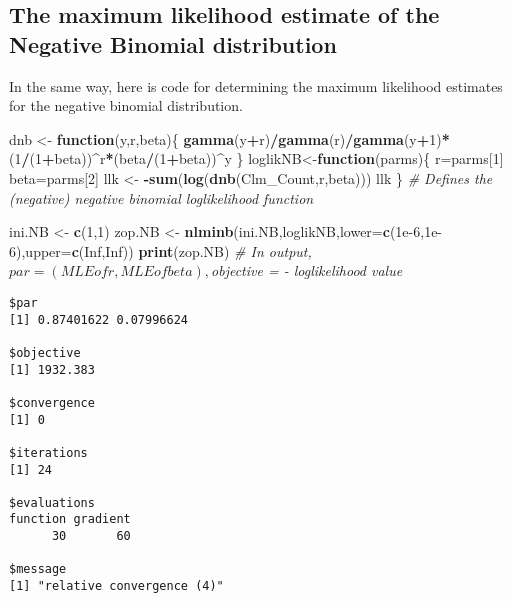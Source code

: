 \documentclass[]{book}
\newenvironment{Shaded}{\begin{snugshade}}{\end{snugshade}}
\newcommand{\KeywordTok}[1]{\textcolor[rgb]{0.13,0.29,0.53}{\textbf{#1}}}
\newcommand{\DataTypeTok}[1]{\textcolor[rgb]{0.13,0.29,0.53}{#1}}
\newcommand{\DecValTok}[1]{\textcolor[rgb]{0.00,0.00,0.81}{#1}}
\newcommand{\FloatTok}[1]{\textcolor[rgb]{0.00,0.00,0.81}{#1}}
\newcommand{\StringTok}[1]{\textcolor[rgb]{0.31,0.60,0.02}{#1}}
\newcommand{\CommentTok}[1]{\textcolor[rgb]{0.56,0.35,0.01}{\textit{#1}}}
\newcommand{\OtherTok}[1]{\textcolor[rgb]{0.56,0.35,0.01}{#1}}
\newcommand{\ControlFlowTok}[1]{\textcolor[rgb]{0.13,0.29,0.53}{\textbf{#1}}}
\newcommand{\OperatorTok}[1]{\textcolor[rgb]{0.81,0.36,0.00}{\textbf{#1}}}
\newcommand{\NormalTok}[1]{#1}
\theoremstyle{definition}
\theoremstyle{definition}
\theoremstyle{definition}
\theoremstyle{remark}
\begin{document}
\subsection{The maximum likelihood estimate of the Negative Binomial
distribution}\label{the-maximum-likelihood-estimate-of-the-negative-binomial-distribution}

In the same way, here is code for determining the maximum likelihood
estimates for the negative binomial distribution.

\begin{Shaded}
\begin{Highlighting}[]
\NormalTok{dnb <-}\StringTok{ }\ControlFlowTok{function}\NormalTok{(y,r,beta)\{}
  \KeywordTok{gamma}\NormalTok{(y}\OperatorTok{+}\NormalTok{r)}\OperatorTok{/}\KeywordTok{gamma}\NormalTok{(r)}\OperatorTok{/}\KeywordTok{gamma}\NormalTok{(y}\OperatorTok{+}\DecValTok{1}\NormalTok{)}\OperatorTok{*}\NormalTok{(}\DecValTok{1}\OperatorTok{/}\NormalTok{(}\DecValTok{1}\OperatorTok{+}\NormalTok{beta))}\OperatorTok{^}\NormalTok{r}\OperatorTok{*}\NormalTok{(beta}\OperatorTok{/}\NormalTok{(}\DecValTok{1}\OperatorTok{+}\NormalTok{beta))}\OperatorTok{^}\NormalTok{y}
\NormalTok{\}}
\NormalTok{loglikNB<-}\ControlFlowTok{function}\NormalTok{(parms)\{ }
\NormalTok{  r=parms[}\DecValTok{1}\NormalTok{]}
\NormalTok{  beta=parms[}\DecValTok{2}\NormalTok{]}
\NormalTok{  llk <-}\StringTok{ }\OperatorTok{-}\KeywordTok{sum}\NormalTok{(}\KeywordTok{log}\NormalTok{(}\KeywordTok{dnb}\NormalTok{(Clm_Count,r,beta)))}
\NormalTok{  llk}
\NormalTok{\} }\CommentTok{# Defines the (negative) negative binomial loglikelihood function}

\NormalTok{ini.NB <-}\StringTok{ }\KeywordTok{c}\NormalTok{(}\DecValTok{1}\NormalTok{,}\DecValTok{1}\NormalTok{)}
\NormalTok{zop.NB <-}\StringTok{ }\KeywordTok{nlminb}\NormalTok{(ini.NB,loglikNB,}\DataTypeTok{lower=}\KeywordTok{c}\NormalTok{(}\FloatTok{1e-6}\NormalTok{,}\FloatTok{1e-6}\NormalTok{),}\DataTypeTok{upper=}\KeywordTok{c}\NormalTok{(}\OtherTok{Inf}\NormalTok{,}\OtherTok{Inf}\NormalTok{))}
\KeywordTok{print}\NormalTok{(zop.NB) }\CommentTok{# In output, $par = (MLE of r, MLE of beta), $objective = - loglikelihood value}
\end{Highlighting}
\end{Shaded}

\begin{verbatim}
$par
[1] 0.87401622 0.07996624

$objective
[1] 1932.383

$convergence
[1] 0

$iterations
[1] 24

$evaluations
function gradient 
      30       60 

$message
[1] "relative convergence (4)"
\end{verbatim}
\end{document}
